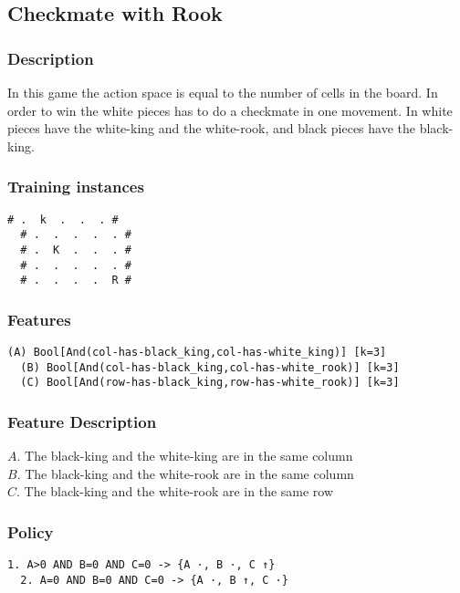 \documentclass[a4paper]{article}
\begin{document}
\subsection{Checkmate with Rook}
\subsubsection{Description}
In this game the action space is equal to the number of cells in the board. In order to win the white pieces has to do a checkmate in one movement. In white pieces have the white-king and the white-rook, and black pieces have the black-king.

\subsubsection{Training instances}
\begin{Verbatim}[fontsize=\footnotesize]
  # .  k  .  .  . #
  # .  .  .  .  . #
  # .  K  .  .  . #
  # .  .  .  .  . #
  # .  .  .  .  R #
\end{Verbatim}

\subsubsection{Features}
\begin{Verbatim}[fontsize=\footnotesize]
  (A) Bool[And(col-has-black_king,col-has-white_king)] [k=3]
  (B) Bool[And(col-has-black_king,col-has-white_rook)] [k=3]
  (C) Bool[And(row-has-black_king,row-has-white_rook)] [k=3]
\end{Verbatim}

\subsubsection{Feature Description}
$A$. The black-king and the white-king are in the same column\\
$B$. The black-king and the white-rook are in the same column\\
$C$. The black-king and the white-rook are in the same row

\subsubsection{Policy}
\begin{Verbatim}[fontsize=\footnotesize]
  1. A>0 AND B=0 AND C=0 -> {A ·, B ·, C ↑}
  2. A=0 AND B=0 AND C=0 -> {A ·, B ↑, C ·}
\end{Verbatim}
\end{document}
